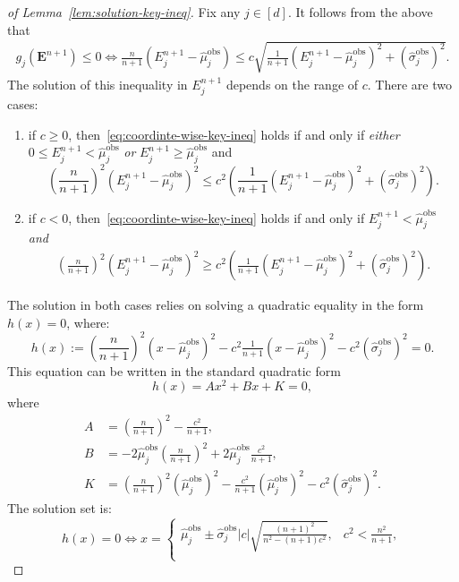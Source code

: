 \begin{proof}[of Lemma~\ref{lem:solution-key-ineq}]
Fix any $j\in [d]$. It follows from the above that
\begin{align}
    g_j(\mathbf{E}^{n+1}) \leq 0 \iff \frac{n}{n+1}\left(E^{n+1}_j-\hat{\mu}^\mathrm{obs}_j\right) \leq c\sqrt{\frac{1}{n+1}\left(E^{n+1}_j-\hat{\mu}^\mathrm{obs}_j\right)^2+(\hat{\sigma}^\mathrm{obs}_j)^2}.
    \label{eq:coordinte-wise-key-ineq}
\end{align}
The solution of this inequality in $E^{n+1}_j$ depends on the range of $c$. There are two cases:
\begin{enumerate}
\item if $c \geq 0$, then~\eqref{eq:coordinte-wise-key-ineq} holds if and only if \emph{either} $0\leq E^{n+1}_j < \hat{\mu}^\mathrm{obs}_j$ \emph{or} $E^{n+1}_j \geq \hat{\mu}^\mathrm{obs}_j$ and
    \[
    \left(\frac{n}{n+1}\right)^2\left(E^{n+1}_j-\hat{\mu}^\mathrm{obs}_j\right)^2 \leq c^2\left(\frac{1}{n+1}(E^{n+1}_j-\hat{\mu}^\mathrm{obs}_j)^2 + (\hat{\sigma}^\mathrm{obs}_j)^2\right).
    \]
\item if $c < 0$, then~\eqref{eq:coordinte-wise-key-ineq} holds if and only if $E^{n+1}_j <  \hat{\mu}^\mathrm{obs}_j$ \emph{and}
    \begin{align*}
        \left(\frac{n}{n+1}\right)^2\left(E^{n+1}_j-\hat{\mu}^\mathrm{obs}_j\right)^2 \geq c^2\left(\tfrac{1}{n+1}\left(E^{n+1}_j-\hat{\mu}^\mathrm{obs}_j\right)^2 + (\hat{\sigma}^\mathrm{obs}_j)^2\right).
    \end{align*}
  \end{enumerate}
  The solution in both cases relies on solving a quadratic equality in the form $h(x) = 0$, where:
\[
h(x):=\left(\frac{n}{n+1}\right)^2\left(x-\hat{\mu}^\mathrm{obs}_j\right)^2 - c^2\tfrac{1}{n+1}\left(x-\hat{\mu}^\mathrm{obs}_j\right)^2 - c^2(\hat{\sigma}^\mathrm{obs}_j)^2 = 0.
\]
This equation can be written in the standard quadratic form
\[
h(x)= Ax^2+Bx +K = 0,
\]
where
\begin{align*}
 A & = \left(\frac{n}{n+1}\right)^2 - \frac{c^2}{n+1}, \\
 B & = -2\hat{\mu}^\mathrm{obs}_j\left(\frac{n}{n+1}\right)^2+2\hat{\mu}^\mathrm{obs}_j \frac{c^2}{n+1}, \\
 K & = \left(\frac{n}{n+1}\right)^2(\hat{\mu}^\mathrm{obs}_j)^2-\frac{c^2}{n+1}(\hat{\mu}^\mathrm{obs}_j)^2-c^2(\hat{\sigma}^\mathrm{obs}_j)^2.
\end{align*}
The solution set is:
\[h(x) = 0 \iff x=
\begin{cases}
    \hat{\mu}^\mathrm{obs}_j \pm \hat{\sigma}^\mathrm{obs}_j|c|\sqrt{\tfrac{(n+1)^2}{n^2-(n+1)c^2}}, & c^2 < \tfrac{n^2}{n+1},\\

\end{cases}\]
\end{proof}
